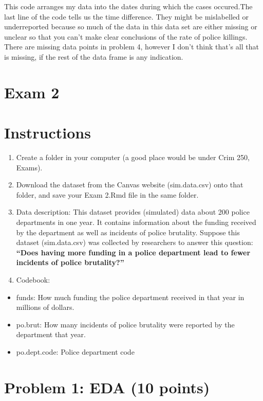 \documentclass[
]{article}
\providecommand{\tightlist}{%
  \setlength{\itemsep}{0pt}\setlength{\parskip}{0pt}}
\begin{document}
This code arranges my data into the dates during which the cases
occured.The last line of the code tells us the time difference. They
might be mislabelled or underreported because so much of the data in
this data set are either missing or unclear so that you can't make clear
conclusions of the rate of police killings. There are missing data
points in problem 4, however I don't think that's all that is missing,
if the rest of the data frame is any indication.

\hypertarget{exam-2}{%
\section{Exam 2}\label{exam-2}}

\hypertarget{instructions-1}{%
\section{Instructions}\label{instructions-1}}

\begin{enumerate}
\def\labelenumi{\alph{enumi}.}
\item
  Create a folder in your computer (a good place would be under Crim
  250, Exams).
\item
  Download the dataset from the Canvas website (sim.data.csv) onto that
  folder, and save your Exam 2.Rmd file in the same folder.
\item
  Data description: This dataset provides (simulated) data about 200
  police departments in one year. It contains information about the
  funding received by the department as well as incidents of police
  brutality. Suppose this dataset (sim.data.csv) was collected by
  researchers to answer this question: \textbf{``Does having more
  funding in a police department lead to fewer incidents of police
  brutality?''}
\item
  Codebook:
\end{enumerate}

\begin{itemize}
\tightlist
\item
  funds: How much funding the police department received in that year in
  millions of dollars.
\item
  po.brut: How many incidents of police brutality were reported by the
  department that year.
\item
  po.dept.code: Police department code
\end{itemize}

\hypertarget{problem-1-eda-10-points}{%
\section{Problem 1: EDA (10 points)}\label{problem-1-eda-10-points}}
\end{document}
